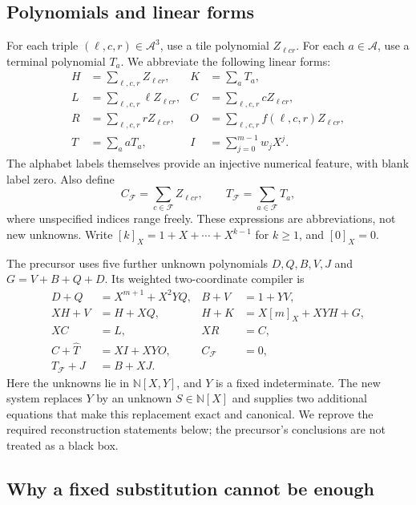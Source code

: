 \documentclass[11pt,letterpaper]{article}
\numberwithin{equation}{section}
\theoremstyle{definition}
\newcommand{\N}{\mathbb N}
\newcommand{\A}{\mathcal A}
\newcommand{\F}{\mathcal F}
\newcommand{\rep}[1]{[#1]_X}
\newcommand{\CF}{C_{\F}}
\newcommand{\TF}{T_{\F}}
\begin{document}
\subsection{Polynomials and linear forms}

For each triple $(\ell,c,r)\in\A^3$, use a tile polynomial $Z_{\ell cr}$.
For each $a\in\A$, use a terminal polynomial $T_a$. We abbreviate the
following linear forms:
\begin{align}
 H&=\sum_{\ell,c,r}Z_{\ell cr}, & K&=\sum_aT_a,\label{pwh:oc:eq:totals}\\
 L&=\sum_{\ell,c,r}\ell Z_{\ell cr}, &
 C&=\sum_{\ell,c,r}c Z_{\ell cr},\label{pwh:oc:eq:features-a}\\
 R&=\sum_{\ell,c,r}r Z_{\ell cr}, &
 O&=\sum_{\ell,c,r}f(\ell,c,r)Z_{\ell cr},\label{pwh:oc:eq:features-b}\\
 \widehat T&=\sum_a aT_a, &
 I&=\sum_{j=0}^{m-1}w_jX^j.\label{pwh:oc:eq:features-c}
\end{align}
The alphabet labels themselves provide an injective numerical feature,
with blank label zero. Also define
\begin{equation}
 \CF=\sum_{c\in\F}Z_{\ell cr},\qquad
 \TF=\sum_{a\in\F}T_a,
 \label{pwh:oc:eq:acceptingforms}
\end{equation}
where unspecified indices range freely. These expressions are
abbreviations, not new unknowns. Write
$\rep{k}=1+X+\cdots+X^{k-1}$ for $k\ge1$, and $\rep0=0$.

The precursor \cite{oc:Precursor} uses five further unknown polynomials
$D,Q,B,V,J$ and $G=V+B+Q+D$. Its weighted two-coordinate compiler is
\begin{align*}
 D+Q&=X^{m+1}+X^2YQ, & B+V&=1+YV,\\
 XH+V&=H+XQ, & H+K&=X\rep m+XYH+G,\\
 XC&=L, & XR&=C,\\
 C+\widehat T&=XI+XYO, & \CF&=0,\\
 \TF+J&=B+XJ.
\end{align*}
Here the unknowns lie in $\N[X,Y]$, and $Y$ is a fixed indeterminate.
The new system replaces $Y$ by an unknown $S\in\N[X]$ and supplies two
additional equations that make this replacement exact and canonical.
We reprove the required reconstruction statements below; the precursor's
conclusions are not treated as a black box.

\subsection{Why a fixed substitution cannot be enough}
\end{document}
